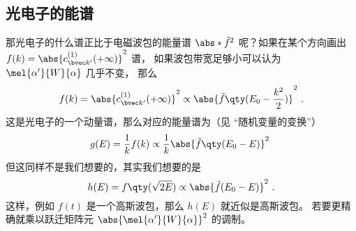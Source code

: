 
\subsection{光电子的能谱}
那光电子的什么谱正比于电磁波包的能量谱 $\abs*{\tilde f}^2$ 呢？如果在某个方向画出 $f(k) = \abs{c_{\bvec k'}^{(1)}(+\infty)}^2$ 谱， 如果波包带宽足够小可以认为 $\mel{\alpha'}{W}{\alpha}$ 几乎不变， 那么
\begin{equation}
f(k) = \abs{c_{\bvec k'}^{(1)}(+\infty)}^2 \propto \abs{\tilde f\qty(E_0-\frac{k^2}{2})}^2~.
\end{equation}
这是光电子的一个动量谱，那么对应的能量谱为（见 “随机变量的变换”）
\begin{equation}
g(E) = \frac{1}{k}f(k) \propto \frac{1}{k}\abs{\tilde f\qty(E_0-E)}^2~
\end{equation}
但这同样不是我们想要的，其实我们想要的是
\begin{equation}
h(E) = f\qty(\sqrt{2E}) \propto \abs{\tilde f(E_0-E)}^2~.
\end{equation}
这样，例如 $f(t)$ 是一个高斯波包，那么 $h(E)$ 就近似是高斯波包。 若要更精确就乘以跃迁矩阵元 $\abs{\mel{\alpha'}{W}{\alpha}}^2$ 的调制。

